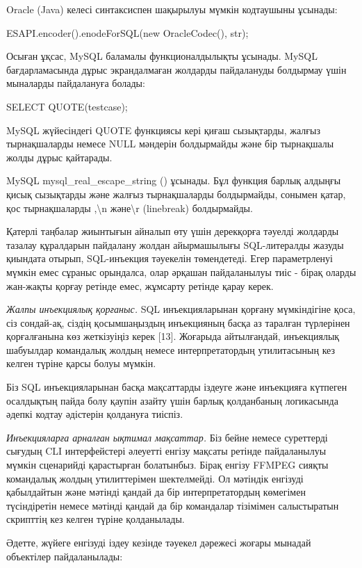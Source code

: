 Oracle (Java) келесі синтаксиспен шақырылуы мүмкін кодтаушыны ұсынады:

ESAPI.encoder().enodeForSQL(new OracleCodec(), str);

Осыған ұқсас, MySQL баламалы функционалдылықты ұсынады. MySQL
бағдарламасында дұрыс экрандалмаған жолдарды пайдалануды болдырмау үшін
мыналарды пайдалануға болады:

SELECT
QUOTE(\textquotesingle test\textquotesingle\textquotesingle case\textquotesingle);

MySQL жүйесіндегі QUOTE функциясы кері қиғаш сызықтарды, жалғыз
тырнақшаларды немесе NULL мәндерін болдырмайды және бір тырнақшалы жолды
дұрыс қайтарады.

MySQL mysql\_real\_escape\_string () ұсынады. Бұл функция барлық алдыңғы
қисық сызықтарды және жалғыз тырнақшаларды болдырмайды, сонымен қатар,
қос тырнақшаларды ,\textbackslash n және\textbackslash r (linebreak)
болдырмайды.

Қатерлі таңбалар жиынтығын айналып өту үшін дерекқорға тәуелді жолдарды
тазалау құралдарын пайдалану жолдан айырмашылығы SQL-литералды жазуды
қиындата отырып, SQL-инъекция тәуекелін төмендетеді. Егер параметрленуі
мүмкін емес сұраныс орындалса, олар әрқашан пайдаланылуы тиіс - бірақ
оларды жан-жақты қорғау ретінде емес, жұмсарту ретінде қарау керек.

\emph{Жалпы инъекциялық қорғаныс.} SQL инъекцияларынан қорғану
мүмкіндігіне қоса, сіз сондай-ақ, сіздің қосымшаңыздың инъекцияның басқа
аз таралған түрлерінен қорғалғанына көз жеткізуіңіз керек {[}13{]}.
Жоғарыда айтылғандай, инъекциялық шабуылдар командалық жолдың немесе
интерпретатордың утилитасының кез келген түріне қарсы болуы мүмкін.

Біз SQL инъекцияларынан басқа мақсаттарды іздеуге және инъекцияға
күтпеген осалдықтың пайда болу қаупін азайту үшін барлық қолданбаның
логикасында әдепкі кодтау әдістерін қолдануға тиіспіз.

\emph{Инъекцияларға арналған ықтимал мақсаттар.} Біз бейне немесе
суреттерді сығудың CLI интерфейстері әлеуетті енгізу мақсаты ретінде
пайдаланылуы мүмкін сценарийді қарастырған болатынбыз. Бірақ енгізу
FFMPEG сияқты командалық жолдың утилиттерімен шектелмейді. Ол мәтіндік
енгізуді қабылдайтын және мәтінді қандай да бір интерпретатордың
көмегімен түсіндіретін немесе мәтінді қандай да бір командалар тізімімен
салыстыратын скрипттің кез келген түріне қолданылады.

Әдетте, жүйеге енгізуді іздеу кезінде тәуекел дәрежесі жоғары мынадай
объектілер пайдаланылады:

